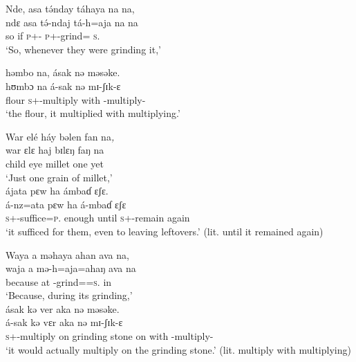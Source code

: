 \ea    Nde,  asa  t\'ənday  táhaya  na  na,    \\
\gll ndɛ  asa t\'ə-ndaj    tá-h=aja      na  na\\
so  if     \textsc{p}+{\IFV}-{\PRG}  \textsc{p}+{\IFV}-grind={\PLU}  \textsc{s}.{\DO}  {\PSP}\\
\glt ‘So, whenever they were grinding it,’\\
\medskip

 həmbo  na, ásak  nə  məsəke.\\
\gll hʊmbɔ na á-sak nə mɪ-ʃɪk-ɛ\\
flour     {\PSP}  \textsc{s}+{\IFV}-multiply  with  {\NOM}{}-multiply-{\CL}\\
\glt ‘the flour, it multiplied with multiplying.’ \\
\z

\ea    War  elé  háy  bəlen  fan  na\textit,\\
\gll war     ɛlɛ   haj   bɪlɛŋ   faŋ   na\\
child   eye   millet   one    yet   {\PSP}\\
\glt ‘Just one grain of millet,’\\

\medskip
 ájata   pɛw  ha  ámbaɗ  ɛʃɛ.\\
\gll á-nz=ata                    pɛw   ha  á-mbaɗ    ɛʃɛ\\
 \textsc{s}+{\IFV}-suffice=\textsc{p}.{\IO}       enough   until     \textsc{s}+{\IFV}-remain   again\\
\glt ‘it sufficed for them, even to leaving leftovers.’ (lit. until it remained again)\\
\z

\ea    Waya  a  məhaya  ahan  ava  na,\\
\gll waja   a  mə-h=aja=ahaŋ      ava    na\\
because  at   {\NOM}{}-grind={\PLU}=\textsc{s}.{\POSS}   in   {\PSP}\\
\glt ‘Because, during its grinding,’\\

\clearpage
\medskip
 ásak  kə  ver  aka  nə  məsəke.\\
\gll á{}-sak                    kə   vɛr               aka   nə   mɪ-ʃɪk-ɛ\\
 \textsc{s}+{\IFV}-multiply   on     {grinding stone}     on    with   {\NOM}{}-multiply-{\CL}\\
\glt ‘it would actually multiply on the grinding stone.' (lit. multiply with multiplying)
\z

